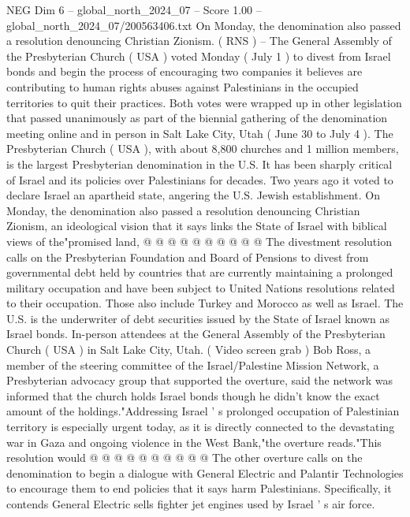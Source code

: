 \begin{textsample}{NEG Dim 6 – global\_north\_2024\_07 – Score 1.00 – global\_north\_2024\_07/200563406.txt}  \label{ex:f6_neg_145}
On Monday, the denomination also passed a resolution denouncing Christian Zionism. ( RNS ) -- The General Assembly of the Presbyterian Church ( USA ) voted Monday ( July 1 ) to divest from Israel bonds and begin the process of encouraging two companies it believes are contributing to human rights abuses against Palestinians in the occupied territories to quit their practices.
Both votes were wrapped up in other legislation that passed unanimously as part of the biennial gathering of the denomination meeting online and in person in Salt Lake City, Utah ( June 30 to July 4 ).
The Presbyterian Church ( USA ), with about 8,800 churches and 1 million members, is the largest Presbyterian denomination in the U.S.
It has been sharply critical of Israel and its policies over Palestinians for decades.
Two years ago it voted to declare Israel an apartheid state, angering the U.S.
Jewish establishment.
On Monday, the denomination also passed a resolution denouncing Christian Zionism, an ideological vision that it says links the State of Israel with biblical views of the"promised land, @ @ @ @ @ @ @ @ @ @ The divestment resolution calls on the Presbyterian Foundation and Board of Pensions to divest from governmental debt held by countries that are currently maintaining a prolonged military occupation and have been subject to United Nations resolutions related to their occupation.
Those also include Turkey and Morocco as well as Israel.
The U.S. is the underwriter of debt securities issued by the State of Israel known as Israel bonds.
In-person attendees at the General Assembly of the Presbyterian Church ( USA ) in Salt Lake City, Utah. ( Video screen grab ) Bob Ross, a member of the steering committee of the Israel/Palestine Mission Network, a Presbyterian advocacy group that supported the overture, said the network was informed that the church holds Israel bonds though he didn't know the exact amount of the holdings."Addressing Israel ' s prolonged occupation of Palestinian territory is especially urgent today, as it is directly connected to the devastating war in Gaza and ongoing violence in the West Bank,"the overture reads."This resolution would @ @ @ @ @ @ @ @ @ @ The other overture calls on the denomination to begin a dialogue with General Electric and Palantir Technologies to encourage them to end policies that it says harm Palestinians.
Specifically, it contends General Electric sells fighter jet engines used by Israel ' s air force.

\end{textsample}
